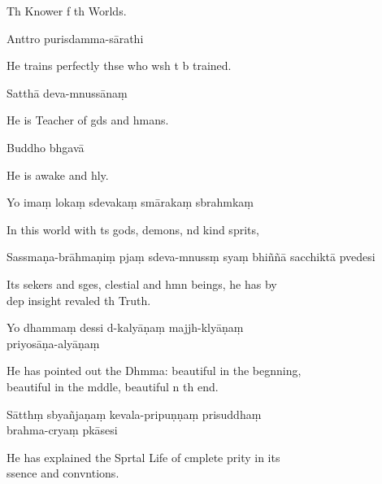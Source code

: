 \begin{english}
  Th Knower f th Worlds.
\end{english}

Anttro purisdamma-sārathi

\begin{english}
  He trains perfectly thse who wsh t b trained.
\end{english}

Satthā deva-mnussānaṃ

\begin{english}
  He is Teacher of gds and hmans.
\end{english}

Buddho bhgavā

\begin{english}
  He is awake and hly.
\end{english}

Yo imaṃ lokaṃ sdevakaṃ smārakaṃ sbrahmkaṃ

\begin{english}
  In this world with ts gods, demons, nd kind sprits,
\end{english}

Sassmaṇa-brāhmaṇiṃ pjaṃ sdeva-mnussṃ syaṃ bhiññā sacchiktā pvedesi

\begin{english}
  Its sekers and sges, clestial and hmn beings, he has by \\d{}ep insight revaled th Truth.
\end{english}

Yo dhammaṃ dessi d-kalyāṇaṃ majjh-klyāṇaṃ \\p{}riyosāṇa-alyāṇaṃ

\begin{english}
  He has pointed out the Dhmma: beautiful in the begnning, \\beautiful in the mddle, beautiful n th end.
\end{english}

Sātthṃ sbyañjaṇaṃ kevala-pripuṇṇaṃ prisuddhaṃ \\brahma-cryaṃ pkāsesi

\begin{english}
  He has explained the Sprtal Life of cmplete prity in its \\ssence and convntions.
\end{english}

